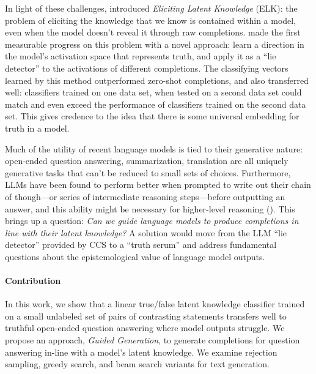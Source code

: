 \documentclass{article}
\begin{document}
In light of these challenges, \citet{christiano2021eliciting} introduced \emph{Eliciting Latent Knowledge} (ELK): the problem of eliciting the knowledge that we know is contained within a model, even when the model doesn't reveal it through raw completions. \cite{ccs} made the first measurable progress on this problem with a novel approach: learn a direction in the model's activation space that represents truth, and apply it as a ``lie detector'' to the activations of different completions. The classifying vectors learned by this method outperformed zero-shot completions, and also transferred well: classifiers trained on one data set, when tested on a second data set could match and even exceed the performance of classifiers trained on the second data set. This gives credence to the idea that there is some universal embedding for truth in a model.



Much of the utility of recent language models is tied to their generative nature: open-ended question answering, summarization, translation are all uniquely generative tasks that can't be reduced to small sets of choices. Furthermore, LLMs have been found to perform better when prompted to write out their chain of though—or series of intermediate reasoning steps—before outputting an answer, and this ability might be necessary for higher-level reasoning (\cite{wei2023chainofthought}). This brings up a question: {\em Can we guide language models to produce completions in line with their latent knowledge?} A solution would move from the LLM ``lie detector'' provided by CCS to a ``truth serum'' and address fundamental questions about the epistemological value of language model outputs.
 
 
 \paragraph{Contribution}

In this work, we show that a linear true/false latent knowledge classifier trained on a small unlabeled set of pairs of contrasting statements transfers well to truthful open-ended question answering where model outputs struggle. We propose an approach, {\em {Guided Generation}}, to generate completions for question answering in-line with a model's latent knowledge. We examine rejection sampling, greedy search, and beam search variants for text generation.
\end{document}
